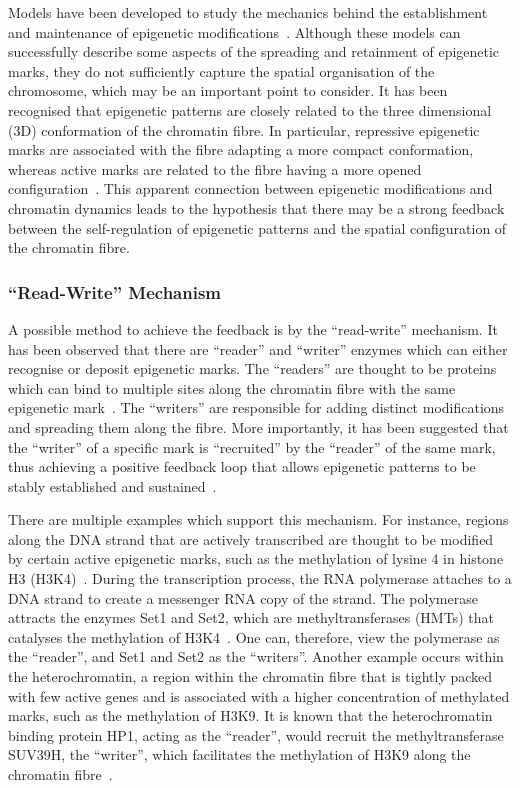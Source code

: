 \documentclass[12pt]{article}
\begin{document}
Models have been developed to study the mechanics behind the establishment and maintenance of epigenetic modifications~\cite{dodd2007, hathaway2012, zhang2014, jost2014}. Although these models can successfully describe some aspects of the spreading and retainment of epigenetic marks, they do not sufficiently capture the spatial organisation of the chromosome, which may be an important point to consider. It has been recognised that epigenetic patterns are closely related to the three dimensional (3D) conformation of the chromatin fibre. In particular, repressive epigenetic marks are associated with the fibre adapting a more compact conformation, whereas active marks are related to the fibre having a more opened configuration~\cite{cortini2016, shahbazian2007, hathaway2012}. This apparent connection between epigenetic modifications and chromatin dynamics leads to the hypothesis that there may be a strong feedback between the self-regulation of epigenetic patterns and the spatial configuration of the chromatin fibre.%

\subsubsection{``Read-Write'' Mechanism}
\label{sec:read-write}
A possible method to achieve the feedback is by the ``read-write'' mechanism. It has been observed that there are ``reader'' and ``writer'' enzymes which can either recognise or deposit epigenetic marks. The ``readers'' are thought to be proteins which can bind to multiple sites along the chromatin fibre with the same epigenetic mark~\cite{brackley2013}. The ``writers'' are responsible for adding distinct modifications and spreading them along the fibre. More importantly, it has been suggested that the ``writer'' of a specific mark is ``recruited'' by the ``reader'' of the same mark, thus achieving a positive feedback loop that allows epigenetic patterns to be stably established and sustained~\cite{dodd2007, hathaway2012}. 

There are multiple examples which support this mechanism. For instance, regions along the DNA strand that are actively transcribed are thought to be modified by certain active epigenetic marks, such as the methylation of lysine 4 in histone H3 (H3K4)~\cite{zentner2013}. During the transcription process, the RNA polymerase attaches to a DNA strand to create a messenger RNA copy of the strand. The polymerase attracts the enzymes Set1 and Set2, which are methyltransferases (HMTs) that catalyses the methylation of H3K4~\cite{zentner2013, ruthenburgh2007}. One can, therefore, view the polymerase as the ``reader'', and Set1 and Set2 as the ``writers''. Another example occurs within the heterochromatin, a region within the chromatin fibre that is tightly packed with few active genes and is associated with a higher concentration of methylated marks, such as the methylation of H3K9. It is known that the heterochromatin binding protein HP1, acting as the ``reader'', would recruit the methyltransferase SUV39H, the ``writer'', which facilitates the methylation of H3K9 along the chromatin fibre~\cite{zentner2013}.
\end{document}
